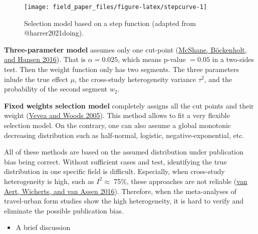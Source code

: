 \documentclass[
  11pt,
  openany]{memoir}
\providecommand{\tightlist}{%
  \setlength{\itemsep}{0pt}\setlength{\parskip}{0pt}}
\begin{document}
\begin{figure}

{\centering \texttt{[image: field\_paper\_files/figure-latex/stepcurve-1]} 

}

\caption{Selection model based on a step function (adapted from @harrer2021doing).}\label{fig:stepcurve}
\end{figure}

\textbf{Three-parameter model} assumes only one cut-point (\protect\hyperlink{ref-mcshaneAdjustingPublicationBias2016}{McShane, Böckenholt, and Hansen 2016}).
That is \(\alpha=0.025\), which means p-value \(=0.05\) in a two-sides test.
Then the weight function only has two segments.
The three parameters inlude the true effect \(\mu\), the cross-study heterogeneity variance \(\tau^2\), and the probability of the second segment \(w_2\).

\textbf{Fixed weights selection model} completely assigns all the cut points and their weight (\protect\hyperlink{ref-veveaPublicationBiasResearch2005}{Vevea and Woods 2005}).
This method allows to fit a very flexible selection model.
On the contrary, one can also assume a global monotonic decreasing distribution such as half-normal, logistic, negative-exponential, etc.

All of these methods are based on the assumed distribution under publication bias being correct.
Without sufficient cases and test, identifying the true distribution in one specific field is difficult.
Especially, when cross-study heterogeneity is high, such as \(I^2\approx\) 75\%, these approaches are not reliable (\protect\hyperlink{ref-vanaertConductingMetaAnalysesBased2016}{van Aert, Wicherts, and van Assen 2016}).
Therefore, when the meta-analyses of travel-urban form studies show the high heterogeneity, it is hard to verify and eliminate the possible publication bias.

\begin{itemize}
\tightlist
\item
  A brief discussion
\end{itemize}
\end{document}
